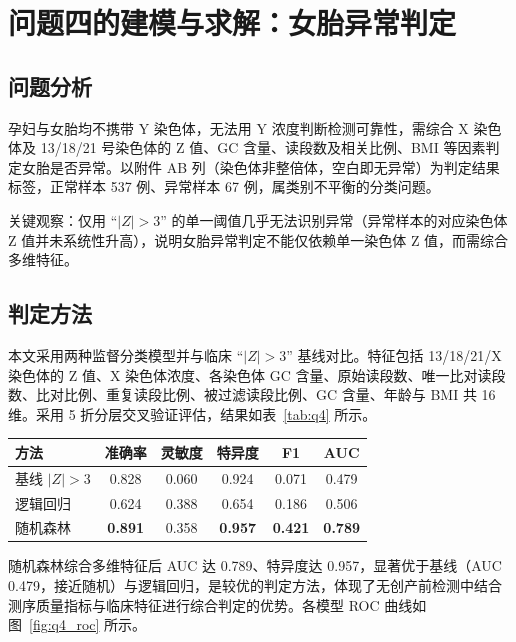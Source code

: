 \section{问题四的建模与求解：女胎异常判定}

\subsection{问题分析}

孕妇与女胎均不携带 Y 染色体，无法用 Y 浓度判断检测可靠性，需综合 X 染色体及 13/18/21 号染色体的 Z 值、GC 含量、读段数及相关比例、BMI 等因素判定女胎是否异常。以附件 AB 列（染色体非整倍体，空白即无异常）为判定结果标签，正常样本 537 例、异常样本 67 例，属类别不平衡的分类问题。

关键观察：仅用 ``$|Z|>3$'' 的单一阈值几乎无法识别异常（异常样本的对应染色体 Z 值并未系统性升高），说明女胎异常判定不能仅依赖单一染色体 Z 值，而需综合多维特征。

\subsection{判定方法}

本文采用两种监督分类模型并与临床 ``$|Z|>3$'' 基线对比。特征包括 13/18/21/X 染色体的 Z 值、X 染色体浓度、各染色体 GC 含量、原始读段数、唯一比对读段数、比对比例、重复读段比例、被过滤读段比例、GC 含量、年龄与 BMI 共 16 维。采用 5 折分层交叉验证评估，结果如表~\ref{tab:q4} 所示。

\begin{center}
\begin{tabular}{lccccc}
\toprule
\textbf{方法} & \textbf{准确率} & \textbf{灵敏度} & \textbf{特异度} & \textbf{F1} & \textbf{AUC} \\
\midrule
基线 $|Z|>3$ & 0.828 & 0.060 & 0.924 & 0.071 & 0.479 \\
逻辑回归 & 0.624 & 0.388 & 0.654 & 0.186 & 0.506 \\
随机森林 & \textbf{0.891} & 0.358 & \textbf{0.957} & \textbf{0.421} & \textbf{0.789} \\
\bottomrule
\end{tabular}
\label{tab:q4}
\end{center}

随机森林综合多维特征后 AUC 达 0.789、特异度达 0.957，显著优于基线（AUC 0.479，接近随机）与逻辑回归，是较优的判定方法，体现了无创产前检测中结合测序质量指标与临床特征进行综合判定的优势\cite{ref3,ref6}。各模型 ROC 曲线如图~\ref{fig:q4_roc} 所示。

